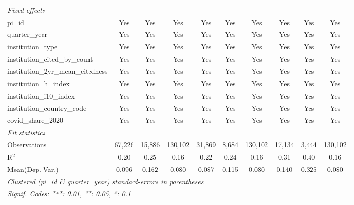 \begin{tabular}{lccccccccc}
   \midrule
   \emph{Fixed-effects}\\
   pi\_id                                                      & Yes           & Yes           & Yes            & Yes           & Yes          & Yes            & Yes          & Yes          & Yes\\  
   quarter\_year                                               & Yes           & Yes           & Yes            & Yes           & Yes          & Yes            & Yes          & Yes          & Yes\\  
   institution\_type                                           & Yes           & Yes           & Yes            & Yes           & Yes          & Yes            & Yes          & Yes          & Yes\\  
   institution\_cited\_by\_count                               & Yes           & Yes           & Yes            & Yes           & Yes          & Yes            & Yes          & Yes          & Yes\\  
   institution\_2yr\_mean\_citedness                           & Yes           & Yes           & Yes            & Yes           & Yes          & Yes            & Yes          & Yes          & Yes\\  
   institution\_h\_index                                       & Yes           & Yes           & Yes            & Yes           & Yes          & Yes            & Yes          & Yes          & Yes\\  
   institution\_i10\_index                                     & Yes           & Yes           & Yes            & Yes           & Yes          & Yes            & Yes          & Yes          & Yes\\  
   institution\_country\_code                                  & Yes           & Yes           & Yes            & Yes           & Yes          & Yes            & Yes          & Yes          & Yes\\  
   covid\_share\_2020                                          & Yes           & Yes           & Yes            & Yes           & Yes          & Yes            & Yes          & Yes          & Yes\\  
   \midrule
   \emph{Fit statistics}\\
   Observations                                                & 67,226        & 15,886        & 130,102        & 31,869        & 8,684        & 130,102        & 17,134       & 3,444        & 130,102\\  
   R$^2$                                                       & 0.20          & 0.25          & 0.16           & 0.22          & 0.24         & 0.16           & 0.31         & 0.40         & 0.16\\  
Mean(Dep. Var.) & 0.096 & 0.162 & 0.080 & 0.087 & 0.115 & 0.080 & 0.140 & 0.325 & 0.080 \\
   \midrule \midrule
   \multicolumn{10}{l}{\emph{Clustered (pi\_id \& quarter\_year) standard-errors in parentheses}}\\
   \multicolumn{10}{l}{\emph{Signif. Codes: ***: 0.01, **: 0.05, *: 0.1}}\\
\end{tabular}
\par\endgroup
